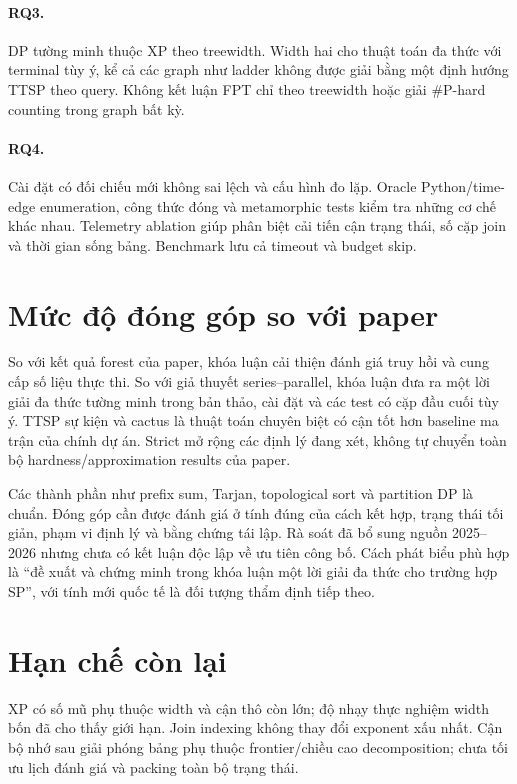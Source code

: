 \paragraph{RQ3.} DP tường minh thuộc XP theo treewidth. Width hai cho thuật toán đa thức với terminal tùy ý, kể cả các graph như ladder không được giải bằng một định hướng TTSP theo query. Không kết luận FPT chỉ theo treewidth hoặc giải \#P-hard counting trong graph bất kỳ.

\paragraph{RQ4.} Cài đặt có \AuditComparisons{} đối chiếu mới không sai lệch và \BenchCases{} cấu hình đo lặp. Oracle Python/time-edge enumeration, công thức đóng và metamorphic tests kiểm tra những cơ chế khác nhau. Telemetry ablation giúp phân biệt cải tiến cận trạng thái, số cặp join và thời gian sống bảng. Benchmark lưu cả \BenchTimeouts{} timeout và \BenchSkips{} budget skip.

\section{Mức độ đóng góp so với paper}

So với kết quả forest của paper, khóa luận cải thiện đánh giá truy hồi và cung cấp số liệu thực thi. So với giả thuyết series--parallel, khóa luận đưa ra một lời giải đa thức tường minh trong bản thảo, cài đặt và các test có cặp đầu cuối tùy ý. TTSP sự kiện và cactus là thuật toán chuyên biệt có cận tốt hơn baseline ma trận của chính dự án. Strict mở rộng các định lý đang xét, không tự chuyển toàn bộ hardness/approximation results của paper.

Các thành phần như prefix sum, Tarjan, topological sort và partition DP là chuẩn. Đóng góp cần được đánh giá ở tính đúng của cách kết hợp, trạng thái tối giản, phạm vi định lý và bằng chứng tái lập. Rà soát đã bổ sung nguồn 2025--2026 nhưng chưa có kết luận độc lập về ưu tiên công bố. Cách phát biểu phù hợp là ``đề xuất và chứng minh trong khóa luận một lời giải đa thức cho trường hợp SP'', với tính mới quốc tế là đối tượng thẩm định tiếp theo.

\section{Hạn chế còn lại}

XP có số mũ phụ thuộc width và cận thô còn lớn; độ nhạy thực nghiệm width bốn đã cho thấy giới hạn. Join indexing không thay đổi exponent xấu nhất. Cận bộ nhớ sau giải phóng bảng phụ thuộc frontier/chiều cao decomposition; chưa tối ưu lịch đánh giá và packing toàn bộ trạng thái.

